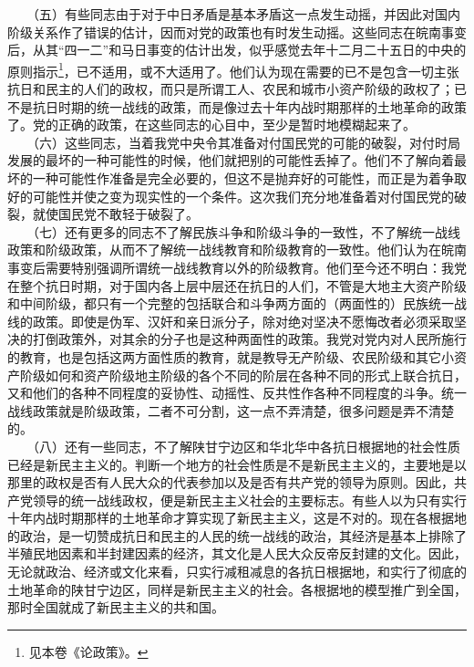 \documentclass[cn,11pt,chinese]{elegantbook}
\begin{document}
　　（五）有些同志由于对于中日矛盾是基本矛盾这一点发生动摇，并因此对国内阶级关系作了错误的估计，因而对党的政策也有时发生动摇。这些同志在皖南事变后，从其“四一二”和马日事变的估计出发，似乎感觉去年十二月二十五日的中央的原则指示\footnote[10]{ 见本卷《论政策》。}，已不适用，或不大适用了。他们认为现在需要的已不是包含一切主张抗日和民主的人们的政权，而只是所谓工人、农民和城市小资产阶级的政权了；已不是抗日时期的统一战线的政策，而是像过去十年内战时期那样的土地革命的政策了。党的正确的政策，在这些同志的心目中，至少是暂时地模糊起来了。\\
　　（六）这些同志，当着我党中央令其准备对付国民党的可能的破裂，对付时局发展的最坏的一种可能性的时候，他们就把别的可能性丢掉了。他们不了解向着最坏的一种可能性作准备是完全必要的，但这不是抛弃好的可能性，而正是为着争取好的可能性并使之变为现实性的一个条件。这次我们充分地准备着对付国民党的破裂，就使国民党不敢轻于破裂了。\\
　　（七）还有更多的同志不了解民族斗争和阶级斗争的一致性，不了解统一战线政策和阶级政策，从而不了解统一战线教育和阶级教育的一致性。他们认为在皖南事变后需要特别强调所谓统一战线教育以外的阶级教育。他们至今还不明白：我党在整个抗日时期，对于国内各上层中层还在抗日的人们，不管是大地主大资产阶级和中间阶级，都只有一个完整的包括联合和斗争两方面的（两面性的）民族统一战线的政策。即使是伪军、汉奸和亲日派分子，除对绝对坚决不愿悔改者必须采取坚决的打倒政策外，对其余的分子也是这种两面性的政策。我党对党内对人民所施行的教育，也是包括这两方面性质的教育，就是教导无产阶级、农民阶级和其它小资产阶级如何和资产阶级地主阶级的各个不同的阶层在各种不同的形式上联合抗日，又和他们的各种不同程度的妥协性、动摇性、反共性作各种不同程度的斗争。统一战线政策就是阶级政策，二者不可分割，这一点不弄清楚，很多问题是弄不清楚的。\\
　　（八）还有一些同志，不了解陕甘宁边区和华北华中各抗日根据地的社会性质已经是新民主主义的。判断一个地方的社会性质是不是新民主主义的，主要地是以那里的政权是否有人民大众的代表参加以及是否有共产党的领导为原则。因此，共产党领导的统一战线政权，便是新民主主义社会的主要标志。有些人以为只有实行十年内战时期那样的土地革命才算实现了新民主主义，这是不对的。现在各根据地的政治，是一切赞成抗日和民主的人民的统一战线的政治，其经济是基本上排除了半殖民地因素和半封建因素的经济，其文化是人民大众反帝反封建的文化。因此，无论就政治、经济或文化来看，只实行减租减息的各抗日根据地，和实行了彻底的土地革命的陕甘宁边区，同样是新民主主义的社会。各根据地的模型推广到全国，那时全国就成了新民主主义的共和国。\\
\newpage
\end{document}
